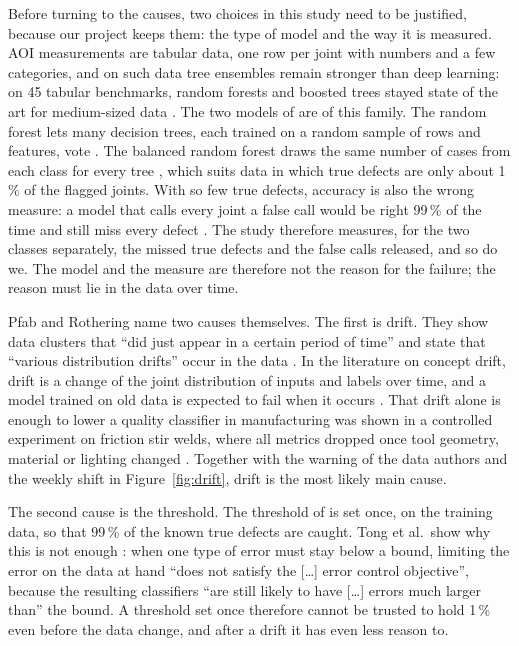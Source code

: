 \documentclass[11pt,a4paper]{article}
\begin{document}
Before turning to the causes, two choices in this study need to be justified, because our project keeps them: the type of model and the way it is measured. AOI measurements are tabular data, one row per joint with numbers and a few categories, and on such data tree ensembles remain stronger than deep learning: on 45 tabular benchmarks, random forests and boosted trees stayed state of the art for medium-sized data \cite{grinsztajn2022}. The two models of \cite{pfab2025} are of this family. The random forest lets many decision trees, each trained on a random sample of rows and features, vote \cite{breiman2001}. The balanced random forest draws the same number of cases from each class for every tree \cite{chen2004}, which suits data in which true defects are only about 1\,\% of the flagged joints. With so few true defects, accuracy is also the wrong measure: a model that calls every joint a false call would be right 99\,\% of the time and still miss every defect \cite{he2009}. The study therefore measures, for the two classes separately, the missed true defects and the false calls released, and so do we. The model and the measure are therefore not the reason for the failure; the reason must lie in the data over time.

Pfab and Rothering name two causes themselves. The first is drift. They show data clusters that ``did just appear in a certain period of time'' and state that ``various distribution drifts'' occur in the data \cite{pfab2025}. In the literature on concept drift, drift is a change of the joint distribution of inputs and labels over time, and a model trained on old data is expected to fail when it occurs \cite{gama2014}. That drift alone is enough to lower a quality classifier in manufacturing was shown in a controlled experiment on friction stir welds, where all metrics dropped once tool geometry, material or lighting changed \cite{bauer2025}. Together with the warning of the data authors and the weekly shift in Figure~\ref{fig:drift}, drift is the most likely main cause.

The second cause is the threshold. The threshold of \cite{pfab2025} is set once, on the training data, so that 99\,\% of the known true defects are caught. Tong et al.\ show why this is not enough \cite{tong2018}: when one type of error must stay below a bound, limiting the error on the data at hand ``does not satisfy the [\ldots] error control objective'', because the resulting classifiers ``are still likely to have [\ldots] errors much larger than'' the bound. A threshold set once therefore cannot be trusted to hold 1\,\% even before the data change, and after a drift it has even less reason to.
\end{document}
